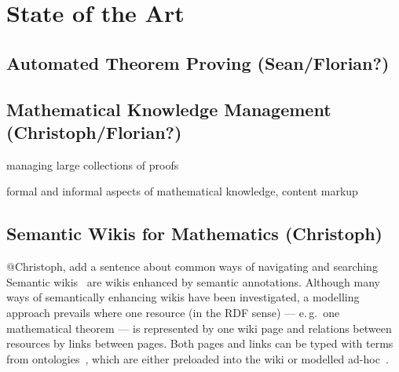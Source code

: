\documentclass{llncs}
\begin{document}
\section{State of the Art}
\label{sec:sota}

\subsection{Automated Theorem Proving (Sean/Florian?)}
\label{sec:atp}


\subsection{Mathematical Knowledge Management (Christoph/Florian?)}
\label{sec:mkm}

managing large collections of proofs

formal and informal aspects of mathematical knowledge, content markup


\subsection{Semantic Wikis for Mathematics (Christoph)}
\label{sec:semwiki}


\begin{todo}{@Christoph, add a sentence about common ways of navigating and searching}
  Semantic wikis~\cite{semwiki06} are wikis enhanced by semantic annotations.  Although
  many ways of semantically enhancing wikis have been investigated, a modelling approach
  prevails where one resource (in the RDF sense) --- e.\,g.\ one
  mathematical theorem --- is represented by one wiki page and relations between resources
  by links between pages.  Both pages and links can be typed with terms from
  ontologies~\cite{OrDeMoVoHa06:annotation-navigation-semwiki}, which are either preloaded
  into the wiki or modelled ad-hoc~\cite{KrSchVr:semwiki-reasoning07}.
\end{todo}
\end{document}
